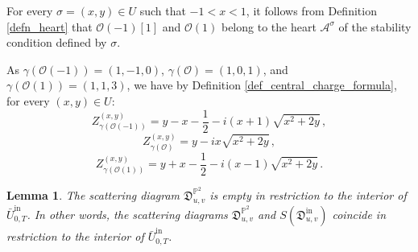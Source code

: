 \documentclass[12pt, a4paper]{amsart}
\newtheorem{lem}[defn]{Lemma}
\newcommand\PP{\mathbb P}
\newcommand\cA{\mathcal A}
\newcommand\cO{\mathcal O}
\newcommand\fD{\mathfrak D}
\newcommand\iin{\mathrm{in}}
\begin{document}
For every $\sigma=(x,y) \in U$ such that 
$-1<x<1$, it follows from Definition
\ref{defn_heart} that $\cO(-1)[1]$ and 
$\cO(1)$ belong to the heart
$\cA^\sigma$ of the stability condition defined by $\sigma$.

As $\gamma(\cO(-1))=(1,-1,0)$, 
$\gamma(\cO)=(1,0,1)$, and 
$\gamma(\cO(1))=(1,1,3)$, we have by Definition \ref{def_central_charge_formula}, for every 
$(x,y) \in U$:
\[ Z_{\gamma(\cO(-1))}^{(x,y)}
=y-x-\frac{1}{2}-i(x+1)\sqrt{x^2+2y}\,,\]
\[Z_{\gamma(\cO)}^{(x,y)}=y-ix\sqrt{x^2+2y}\,,\]
\[Z_{\gamma(\cO(1))}^{(x,y)}
=y+x-\frac{1}{2}-i(x-1)\sqrt{x^2+2y}\,.\]


\begin{lem} \label{lem_coincide_int_T}
The scattering diagram $\fD^{\PP^2}_{u,v}$ is empty in restriction to the interior of 
$\bar{U}^\iin_{0,T}$.
In other words, the scattering diagrams 
$\fD^{\PP^2}_{u,v}$ and 
$S(\fD^\iin_{u,v})$ coincide in restriction to the interior of 
$\bar{U}^\iin_{0,T}$.
\end{lem}
\end{document}
